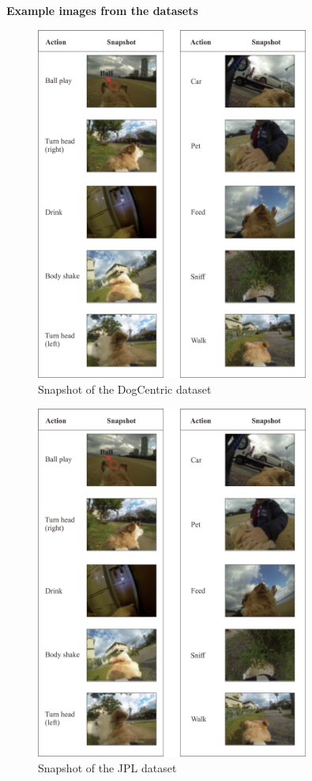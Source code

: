 \label{appendix_a}
\textbf{Example images from the datasets}

\begin{figure}[http]
\centering
\includegraphics[width=0.8\textwidth]{figures/appendix_a}
\caption{Snapshot of the DogCentric dataset} 
\label{fig:append1}
\end{figure}

\begin{figure}[!t]
\centering
\includegraphics[width=0.8\textwidth]{figures/appendix_a}
\caption{Snapshot of the JPL dataset} 
\label{fig:append2}
\end{figure}

